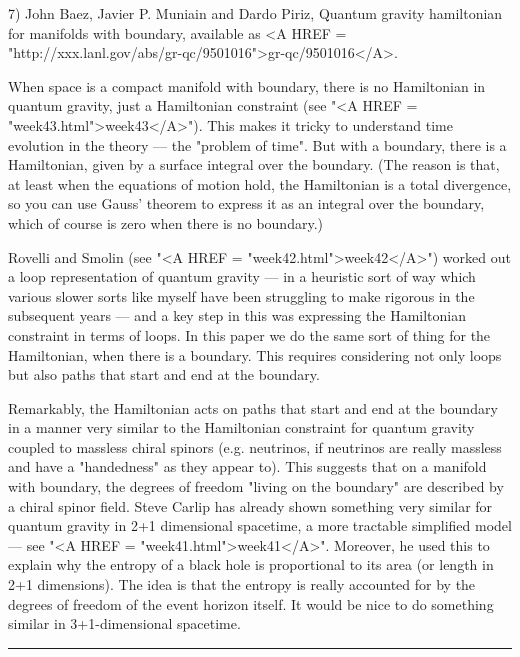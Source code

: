 7) John Baez, Javier P. Muniain and Dardo Piriz, Quantum gravity
hamiltonian for manifolds with boundary, available as <A HREF = "http://xxx.lanl.gov/abs/gr-qc/9501016">gr-qc/9501016</A>.

When space is a compact manifold with boundary, there is no Hamiltonian
in quantum gravity, just a Hamiltonian constraint (see "<A HREF = "week43.html">week43</A>").  This
makes it tricky to understand time evolution in the theory --- the "problem
of time".  But with a boundary, there is a Hamiltonian, given by a surface
integral over the boundary.  (The reason is that, at least when the equations
of motion hold, the Hamiltonian is a total divergence, so you can use
Gauss' theorem to express it as an integral over the boundary, which of
course is zero when there is no boundary.)  

Rovelli and Smolin (see "<A HREF = "week42.html">week42</A>") worked out a loop representation
of quantum gravity --- in a heuristic sort of way which various slower
sorts like myself have been struggling to make rigorous in the subsequent
years --- and a key step in this was expressing the Hamiltonian constraint
in terms of loops.  In this paper we do the same sort of thing for the
Hamiltonian, when there is a boundary.  This requires considering not
only loops but also paths that start and end at the boundary.  

Remarkably, the Hamiltonian acts on paths that start and end at the 
boundary in a manner very similar to the Hamiltonian constraint for 
quantum gravity coupled to massless chiral spinors (e.g. neutrinos, if 
neutrinos are really massless and have a "handedness" as they appear to).  
This suggests that on a manifold with boundary, the degrees of freedom 
"living on the boundary" are described by a chiral spinor field.  Steve Carlip 
has already shown something very similar for quantum gravity in 2+1
dimensional spacetime, a more tractable simplified model --- see "<A HREF = "week41.html">week41</A>".
Moreover, he used this to explain why the entropy of a black hole is 
proportional to its area (or length in 2+1 dimensions).  The idea is that 
the entropy is really accounted for by the degrees of freedom of the event 
horizon itself.  It would be nice to do something similar in 3+1-dimensional 
spacetime.
\par\noindent\rule{\textwidth}{0.4pt}

